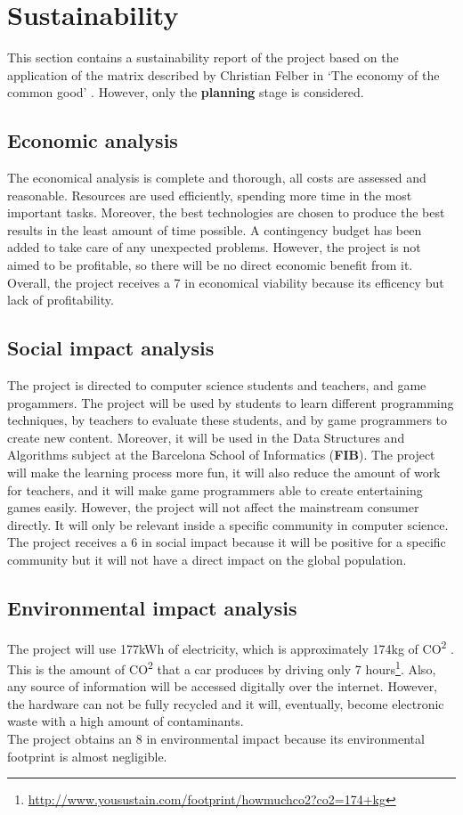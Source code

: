 \documentclass[a4paper,11pt,titlepage,abstract,numbers=noenddot,automark,mnsy,intlimits,rgb,dvipsnames]{report}
\begin{document}
\chapter{Sustainability}
This section contains a sustainability report of the project based on the application of the matrix described by
Christian Felber in `The economy of the common good' \cite{sustainability_report}. However, only the \textbf{planning}
stage is considered.
\section{Economic analysis}
The economical analysis is complete and thorough, all costs are assessed and reasonable.
Resources are used efficiently, spending more time in the most important tasks. Moreover, the best technologies
are chosen to produce the best results in the least amount of time possible. A contingency budget has been added
to take care of any unexpected problems. However, the project is not aimed to be profitable, so there will be
no direct economic benefit from it.
\\[0.1cm]
Overall, the project receives a 7 in economical viability because its efficency but lack of profitability.
\section{Social impact analysis}
The project is directed to computer science students and teachers, and game progammers. The project
will be used by students to learn different programming techniques, by teachers to evaluate these students, and
by game programmers to create new content. Moreover, it will be used in the Data Structures and Algorithms subject
at the Barcelona School of Informatics (\textbf{FIB}). The project will make the learning process more fun, it will also
reduce the amount of work for teachers, and it will make game programmers able to create entertaining games easily.
However, the project will not affect the mainstream consumer directly. It will only be relevant inside a specific
community in computer science.
\\[0.1cm]
The project receives a 6 in social impact because it will be positive for a specific community but it will not
have a direct impact on the global population.
\section{Environmental impact analysis}
The project will use 177kWh of electricity, which is approximately 174kg
of CO\textsuperscript{2} \cite{co2}. This is the amount of CO\textsuperscript{2} that a car produces by driving only 7
hours\footnote{\url{http://www.yousustain.com/footprint/howmuchco2?co2=174+kg}}. Also, any source of
information will be accessed digitally over the internet. However, the hardware can not be fully
recycled and it will, eventually, become electronic waste with a high amount of contaminants.
\\[0.1cm]
The project obtains an 8 in environmental impact because its environmental footprint is almost negligible.
\end{document}
